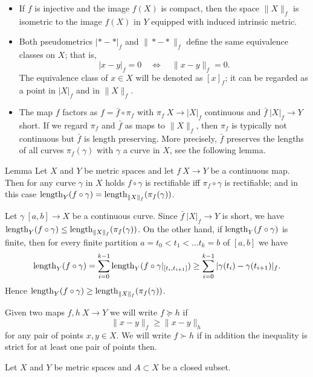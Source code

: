 \documentclass[a4paper,10pt]{amsart}
\begin{document}
\begin{itemize}
\item If $f$ is injective and the image $f(X)$ is compact, then 
the space $\|X\|_f$ is isometric to the image $f(X)$ in $Y$ equipped with induced intrinsic metric. 
\item Both pseudometrics $|{*}-{*}|_f$ and  $\|{*}-{*}\|_f$
define the same equivalence classes on $X$;
that is,
\[|x-y|_f=0\quad\iff\quad\|x-y\|_f=0.\]
The equivalence class of $x\in X$ will be denoted as $[x]_f$; 
it can be regarded as a point in  $|X|_f$ and in $\|X\|_f$.
\item The map $f$ factors as $f=\bar f\circ \pi_f$ with $\pi_f\:X\to|X|_f$ continuous and $\bar f\:|X|_f\to Y$ short.
If we regard $\pi_f$ and $\bar f$ as maps to $\|X\|_f$, then $\pi_f$ is typically not continuous but $\bar f$ is length 
preserving. More precisely, $\bar f$ preserves the lengths of all curves $\pi_f(\gamma)$ with $\gamma$ a curve in $X$, see the following lemma.
\end{itemize}



\begin{thm}{Lemma}\label{lem:intrinsicmetric}
Let $X$ and $Y$ be metric spaces and let $f\:X\to Y$ be a continuous map. Then for any curve $\gamma$ in $X$ holds $f\circ\gamma$
is rectifiable iff $\pi_f\circ\gamma$ is rectifiable; and in this case $\mathop{\rm length}\nolimits_Y(f\circ\gamma)=\mathop{\rm length}\nolimits_{\|X\|_f}(\pi_f(\gamma))$.
\end{thm}
Let $\gamma\:[a,b]\to X$ be a continuous curve.
Since $\bar f\:|X|_f\to Y$ is short, we have $\mathop{\rm length}\nolimits_Y(f\circ \gamma)\leq\mathop{\rm length}\nolimits_{\|X\|_f}(\pi_f(\gamma))$. On the other hand,
if $\mathop{\rm length}\nolimits_Y(f\circ \gamma)$ is finite, then for every finite partition ${a=t_0<t_1<\ldots t_k=b}$ of $[a,b]$ we have
\[\mathop{\rm length}\nolimits_Y(f\circ \gamma)=\sum_{i=0}^{k-1}\mathop{\rm length}\nolimits_Y(f\circ \gamma|_{[t_i,t_{i+1}]})\geq\sum_{i=0}^{k-1}|\gamma(t_i)-\gamma(t_{i+1})|_f.\]
Hence $\mathop{\rm length}\nolimits_Y(f\circ \gamma)\geq\mathop{\rm length}\nolimits_{\|X\|_f}(\pi_f(\gamma))$.
\qeds



Given two maps $f,h\:X\to Y$ we will write $f\succcurlyeq h$ if 
\[\|x-y\|_f\ge \|x-y\|_h\]
for any pair of points $x,y\in X$.
We will write $f\succ h$ 
if in addition the inequality is strict for at least one pair of points then.



Let $X$ and $Y$ be metric spaces and $A\subset X$ be a closed subset.
\end{document}
